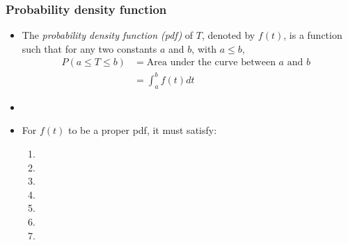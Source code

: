 \begin{frame}
\frametitle{Probability density function}
\begin{itemize}
\item The \emph{probability density function (pdf)} of $T$, denoted by $f(t)$, is a function such that for any two constants $a$ and $b$, with $a \leq b$,
\begin{align*}
P(a \leq T \leq b) &= \mbox{Area under the curve between $a$ and $b$ }  \\
                   &= \int_a^b f(t)dt \nonumber
\end{align*}
\item[]
\item For $f(t)$ to be a proper pdf, it must satisfy:
\begin{enumerate}
\item %
\item[]
\item %
\item[]
\item[]
\item[]
\item[]
\end{enumerate}
\end{itemize}
\end{frame}

